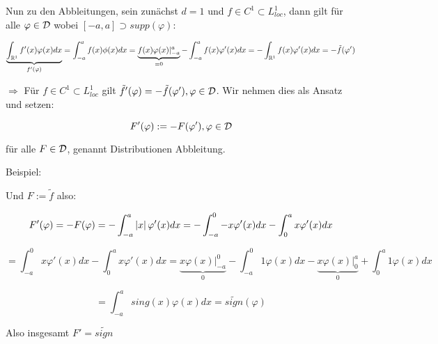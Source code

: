 Nun zu den Abbleitungen, sein zunächst $d=1$ und $f \in C^1 \subset L^1_{loc}$, dann gilt für alle $\varphi \in \mathcal{D}$ wobei $[-a,a] \supset supp(\varphi)$:

\[\underbrace{\int_{\mathbb{R}^1} f'(x) \varphi(x) dx}_{f'(\varphi)} = \int_{-a}^a f(x) \phi(x) dx = \underbrace{f(x)\varphi(x)|_{-a}^{a}}_{=0} - \int_{-a}^a f(x) \varphi'(x) dx = -\int_{\mathbb{R}^1} f(x) \varphi'(x) dx = -\tilde f(\varphi')\]

$\Rightarrow$ Für $f \in C^1 \subset L^1_{loc}$ gilt $\tilde f'(\varphi) = - \tilde f(\varphi'), \varphi \in \mathcal{D}$. Wir nehmen dies als Ansatz und setzen:

\begin{equation}\label{eq.11.2}
    F'(\varphi):=-F(\varphi'), \varphi \in \mathcal{D}
\end{equation}

für alle $F\in \mathcal{D}$, genannt Distributionen Abbleitung.

Beispiel:

\begin{center}
\end{center}
Und $F:=\tilde f$ also:

\[F'(\varphi) = -F(\varphi) = - \int_{-a}^a \left\lvert x \right\rvert \varphi'(x) dx = - \int_{-a}^0 -x \varphi'(x) dx - \int_0^a x \varphi'(x) dx \]

\[= \int_{-a}^0 x \varphi'(x) dx - \int_0^a x \varphi'(x) dx = \underbrace{x \varphi(x)|_{-a}^0}_{0} - \int_{-a}^0 1 \varphi(x) dx - \underbrace{x \varphi(x)|_0^a}_{0} + \int_0^a 1 \varphi(x) dx\]

\[= \int_{-a}^a sing(x) \varphi(x) dx = \tilde{sign}(\varphi)\]

\begin{center}
\end{center}

Also insgesamt $F'=\tilde{sign}$